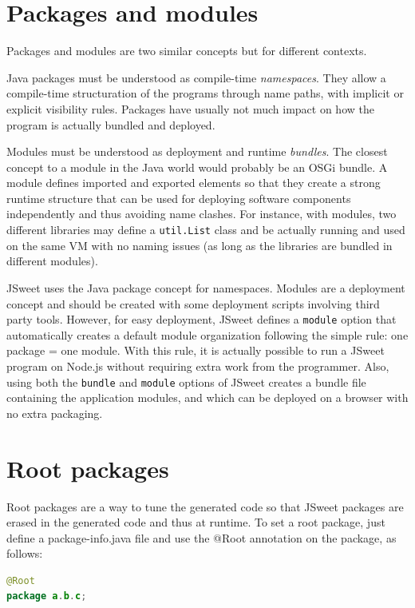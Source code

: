 \documentclass[a4paper]{report}
\begin{document}
\section{Packages and modules}

Packages and modules are two similar concepts but for different contexts.

Java packages must be understood as compile-time \emph{namespaces}. They allow a compile-time structuration of the programs through name paths, with implicit or explicit visibility rules. Packages have usually not much impact on how the program is actually bundled and deployed.

Modules must be understood as deployment and runtime \emph{bundles}. The closest concept to a module in the Java world would probably be an OSGi bundle. A module defines imported and exported elements so that they create a strong runtime structure that can be used for deploying software components independently and thus avoiding name clashes. For instance, with modules, two different libraries may define a \texttt{util.List} class and be actually running and used on the same VM with no naming issues (as long as the libraries are bundled in different modules).

JSweet uses the Java package concept for namespaces. Modules are a deployment concept and should be created with some deployment scripts involving third party tools. However, for easy deployment, JSweet defines a \texttt{module} option that automatically creates a default module organization following the simple rule: one package = one module. With this rule, it is actually possible to run a JSweet program on Node.js without requiring extra work from the programmer. Also, using both the \texttt{bundle} and \texttt{module} options of JSweet creates a bundle file containing the application modules, and which can be deployed on a browser with no extra packaging.

\section{Root packages}

Root packages are a way to tune the generated code so that JSweet packages are erased in the generated code and thus at runtime. To set a root package, just define a package-info.java file and use the @Root annotation on the package, as follows:

\begin{lstlisting}[language=Java]
@Root
package a.b.c;
\end{lstlisting}
\end{document}
